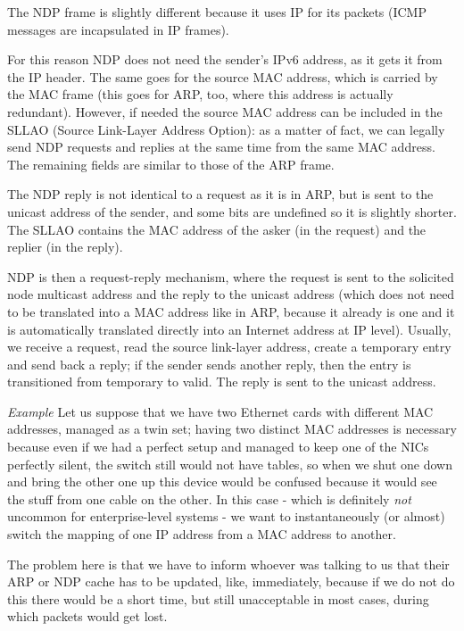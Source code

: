 The NDP frame is slightly different because it uses IP for its packets (ICMP messages are incapsulated in IP frames).

For this reason NDP does not need the sender’s IPv6 address, as it gets it from the IP header. The same goes for the source MAC address, which is carried by the MAC frame (this goes for ARP, too, where this address is actually redundant). However, if needed the source MAC address can be included in the SLLAO (Source Link-Layer Address Option): as a matter of fact, we can legally send NDP requests and replies at the same time from the same MAC address. The remaining fields are similar to those of the ARP frame.

The NDP reply is not identical to a request as it is in ARP, but is sent to the unicast address of the sender, and some bits are undefined so it is slightly shorter. The SLLAO contains the MAC address of the asker (in the request) and the replier (in the reply).

NDP is then a request-reply mechanism, where the request is sent to the solicited node multicast address and the reply to the unicast address (which does not need to be translated into a MAC address like in ARP, because it already is one and it is automatically translated directly into an Internet address at IP level). Usually, we receive a request, read the source link-layer address, create a temporary entry and send back a reply; if the sender sends another reply, then the entry is transitioned from temporary to valid. The reply is sent to the unicast address.

\vspace{0.5em}

\emph{Example} Let us suppose that we have two Ethernet cards with different MAC addresses, managed as a twin set; having two distinct MAC addresses is necessary because even if we had a perfect setup and managed to keep one of the NICs perfectly silent, the switch still would not have tables, so when we shut one down and bring the other one up this device would be confused because it would see the stuff from one cable on the other. In this case - which is definitely \textit{not} uncommon for enterprise-level systems - we want to instantaneously (or almost) switch the mapping of one IP address from a MAC address to another.

The problem here is that we have to inform whoever was talking to us that their ARP or NDP cache has to be updated, like, immediately, because if we do not do this there would be a short time, but still unacceptable in most cases, during which packets would get lost.

